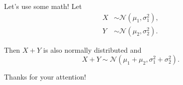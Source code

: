 \documentclass[aspectratio=169]{beamer}
\begin{document}
\begin{frame}{Let's use some math!}
Let
\begin{align*}
X &\sim \mathcal{N}(\mu_1, \sigma^2_1), \\
Y &\sim \mathcal{N}(\mu_2, \sigma^2_2).
\end{align*}

Then $X + Y$ is also normally distributed and
$$ X + Y \sim \mathcal{N}(\mu_1 + \mu_2, \sigma^2_1 + \sigma^2_2). $$
\end{frame}


\begin{frame}
\centering
\Huge
Thanks for your attention!
\end{frame}
\end{document}
